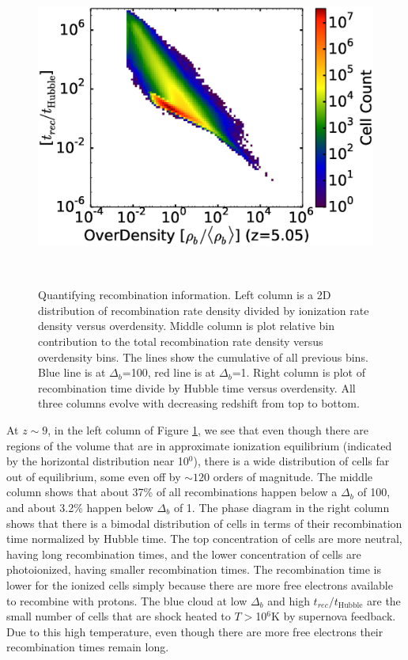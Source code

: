 \begin{figure}[!tp]
\begin{minipage}[h]{0.33\linewidth}
       \includegraphics[trim = 5mm 8mm 0mm 0mm, clip, width=1.0\textwidth]{5_3_HD24175OverDensityRecombHubbleTime.eps}
    \end{minipage}
\\ 
    \caption{Quantifying recombination information.  Left column is a 2D distribution of recombination rate density divided by ionization rate density versus overdensity.  Middle column is plot relative bin contribution to the total recombination rate density versus overdensity bins.  The lines show the cumulative of all previous bins.  Blue line is at $\Delta_b$=100, red line is at $\Delta_b$=1.  Right column is plot of recombination time divide by Hubble time versus overdensity.  All three columns evolve with decreasing redshift from top to bottom.}
    \label{recomb}
\end{figure}

At $z\sim9$, in the left column of Figure \ref{recomb}, we see that even though there are regions of the volume that are in approximate ionization equilibrium (indicated by the horizontal distribution near 10$^0$), there is a wide distribution of cells far out of equilibrium, some even off by $\sim120$ orders of magnitude.  The middle column shows that about 37\% of all recombinations happen below a $\Delta_b$ of 100, and about 3.2\% happen below $\Delta_b$ of 1.  The phase diagram in the right column shows that there is a bimodal distribution of cells in terms of their recombination time normalized by Hubble time.  The top concentration of cells are more neutral, having long recombination times, and the lower concentration of cells are photoionized, having smaller recombination times.  The recombination time is lower for the ionized cells simply because there are more free electrons available to recombine with protons.  The blue cloud at low $\Delta_b$ and high $t_{rec}/t_\mathrm{Hubble}$ are the small number of cells that are shock heated to $T >$10$^6$K by supernova feedback.  Due to this high temperature, even though there are more free electrons their recombination times remain long.  

